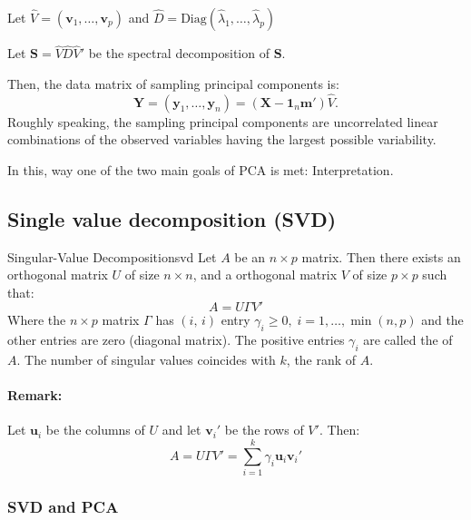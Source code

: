 Let $\hat{V} = (\boldsymbol{v}_1,\ldots,\boldsymbol{v}_p)$ and $\hat{D} = \mathrm{Diag}(\hat{\lambda}_1,\ldots,\hat{\lambda}_p)$

Let $\boldsymbol S = \hat{V}\hat{D}\hat{V}'$ be the spectral decomposition of $\boldsymbol{S}$.

Then, the data matrix of sampling principal components is:
\begin{equation*}
    \boldsymbol{Y} = (\boldsymbol{y}_1,\ldots,\boldsymbol{y}_n) = (\boldsymbol{X} - \boldsymbol 1_n \boldsymbol m ')\hat{V}.
\end{equation*}
Roughly speaking, the sampling principal components are uncorrelated linear combinations of the
observed variables having the largest possible variability.

\begin{note}
    In this, way one of the two main goals of PCA is met: Interpretation.
\end{note}

\subsection{Single value decomposition (SVD)}

\begin{theorem}{Singular-Value Decomposition}{svd}
    Let $A$ be an $n \times p$ matrix. Then there exists an orthogonal matrix $U$ of size $n \times n$,
    and a orthogonal matrix $V$ of size $p \times p$ such that:
    \begin{equation*}
        A = U \Gamma V'
    \end{equation*}
    Where the $n \times p$ matrix $\Gamma$ has $(i,\, i)$ entry $\gamma_i \geq 0,\;i=1,\ldots,\min(n,p)$
    and the other entries are zero (diagonal matrix). The positive entries $\gamma_i$ are called
    the  of $A$. The number of singular values coincides with $k$, the rank of $A$.
    \tcblower
    \paragraph{Remark:} Let $\boldsymbol{u}_i$ be the columns of $U$ and let $\boldsymbol{v}_i'$ be the
    rows of $V'$. Then:
    \begin{equation*}
        A = U \Gamma V' = \sum_{i=1}^k \gamma_i \boldsymbol{u}_i \boldsymbol{v}_i'
    \end{equation*}
\end{theorem}

\subsubsection{SVD and PCA}

